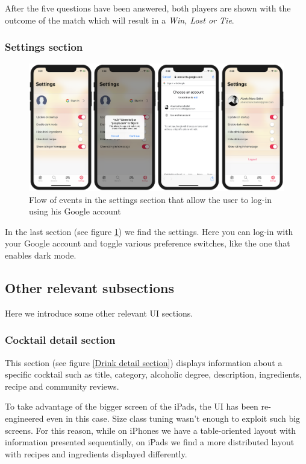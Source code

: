 \documentclass[paper=a4, fontsize=12pt]{scrartcl}
\numberwithin{equation}{section}		%
\numberwithin{figure}{section}			%
\numberwithin{table}{section}				%
\begin{document}
After the five questions have been answered, both players are shown with the outcome of the match which will result in a \textit{Win, Lost or Tie}.

\subsubsection{Settings section}

\begin{figure}[!ht]
\begin{center}
    \includegraphics[width=\textwidth]{UI/UI-settings.png}
    \caption{Flow of events in the settings section that allow the user to log-in using his Google account}
    \label{Settings}
\end{center}
\end{figure}

In the last section (see figure \ref{Settings}) we find the settings. Here you can log-in with your Google account and toggle various preference switches, like the one that enables dark mode.

\subsection{Other relevant subsections}

Here we introduce some other relevant UI sections.

\subsubsection{Cocktail detail section}

This section (see figure \ref{Drink detail section}) displays information about a specific cocktail such as title, category, alcoholic degree, description, ingredients, recipe and community reviews. 

To take advantage of the bigger screen of the iPads, the UI has been re-engineered even in this case. Size class tuning wasn't enough to exploit such big screens. For this reason, while on iPhones we have a table-oriented layout with information presented sequentially, on iPads we find a more distributed layout with recipes and ingredients displayed differently.
\end{document}
